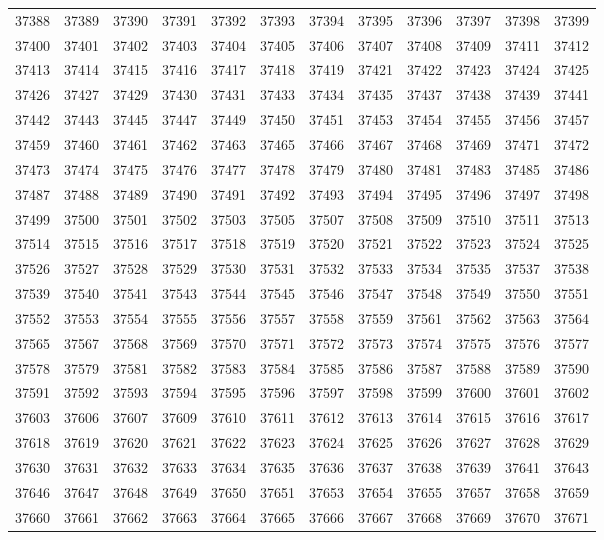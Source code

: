 \begin{center}
\begin{longtable}{llllllllllll}
37388 &37389 &37390 &37391 &37392 &37393 &37394 &37395 &37396 &37397 &37398 &37399 \\
37400 &37401 &37402 &37403 &37404 &37405 &37406 &37407 &37408 &37409 &37411 &37412 \\
37413 &37414 &37415 &37416 &37417 &37418 &37419 &37421 &37422 &37423 &37424 &37425 \\
37426 &37427 &37429 &37430 &37431 &37433 &37434 &37435 &37437 &37438 &37439 &37441 \\
37442 &37443 &37445 &37447 &37449 &37450 &37451 &37453 &37454 &37455 &37456 &37457 \\
37459 &37460 &37461 &37462 &37463 &37465 &37466 &37467 &37468 &37469 &37471 &37472 \\
37473 &37474 &37475 &37476 &37477 &37478 &37479 &37480 &37481 &37483 &37485 &37486 \\
37487 &37488 &37489 &37490 &37491 &37492 &37493 &37494 &37495 &37496 &37497 &37498 \\
37499 &37500 &37501 &37502 &37503 &37505 &37507 &37508 &37509 &37510 &37511 &37513 \\
37514 &37515 &37516 &37517 &37518 &37519 &37520 &37521 &37522 &37523 &37524 &37525 \\
37526 &37527 &37528 &37529 &37530 &37531 &37532 &37533 &37534 &37535 &37537 &37538 \\
37539 &37540 &37541 &37543 &37544 &37545 &37546 &37547 &37548 &37549 &37550 &37551 \\
37552 &37553 &37554 &37555 &37556 &37557 &37558 &37559 &37561 &37562 &37563 &37564 \\
37565 &37567 &37568 &37569 &37570 &37571 &37572 &37573 &37574 &37575 &37576 &37577 \\
37578 &37579 &37581 &37582 &37583 &37584 &37585 &37586 &37587 &37588 &37589 &37590 \\
37591 &37592 &37593 &37594 &37595 &37596 &37597 &37598 &37599 &37600 &37601 &37602 \\
37603 &37606 &37607 &37609 &37610 &37611 &37612 &37613 &37614 &37615 &37616 &37617 \\
37618 &37619 &37620 &37621 &37622 &37623 &37624 &37625 &37626 &37627 &37628 &37629 \\
37630 &37631 &37632 &37633 &37634 &37635 &37636 &37637 &37638 &37639 &37641 &37643 \\
37646 &37647 &37648 &37649 &37650 &37651 &37653 &37654 &37655 &37657 &37658 &37659 \\
37660 &37661 &37662 &37663 &37664 &37665 &37666 &37667 &37668 &37669 &37670 &37671 \\

\end{longtable}
\end{center}
